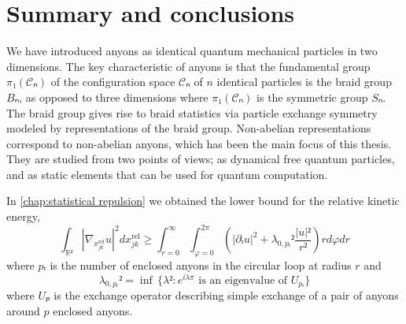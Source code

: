 
\chapter{Summary and conclusions}

We have introduced anyons as identical quantum mechanical particles in two dimensions. The key characteristic of anyons is that the fundamental group $π₁(𝒞ₙ)$ of the configuration space $𝒞ₙ$ of $n$ identical particles is the braid group $Bₙ$, as opposed to three dimensions where $π₁(𝒞ₙ)$ is the symmetric group $Sₙ$. The braid group gives rise to braid statistics via particle exchange symmetry modeled by representations of the braid group. Non-abelian representations correspond to non-abelian anyons, which has been the main focus of this thesis. They are studied from two points of views; as dynamical free quantum particles, and as static elements that can be used for quantum computation.

In \cref{chap:statistical repulsion} we obtained the lower bound for the relative kinetic energy,
\begin{equation}\label{eq:summary lower bound}
∫_{ℝ²} \left|∇_{x_{jk}^\text{rel}} u \right|^2 dx_{jk}^\text{rel}
≥ ∫_{r=0}^∞ ∫_{φ=0}^{2π} \left( \left|∂ᵣu\right|^2 + λ_{0,pᵣ}²\frac{\left|u\right|²}{r²} \right) r dφ dr
\end{equation}
where $pᵣ$ is the number of enclosed anyons in the circular loop at radius $r$ and
\begin{equation}
  λ_{0,pᵣ}² = \inf \, \{ λ² : e^{iλπ} \text{ is an eigenvalue of $U_{pᵣ}$} \}
\end{equation}
where $Uₚ$ is the exchange operator describing simple exchange of a pair of anyons around $p$ enclosed anyons.

